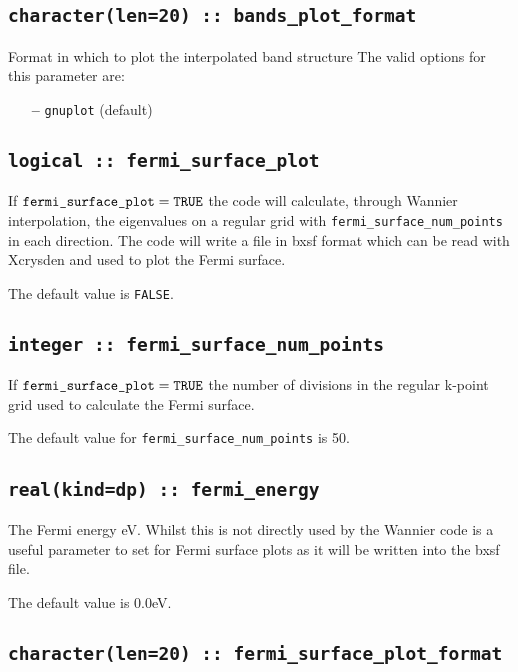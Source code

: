 \subsection[bands\_plot\_format]{\tt character(len=20) :: bands\_plot\_format}

Format in which to plot the interpolated band structure
The valid options for this parameter are:
\begin{itemize}
\item[{\bf --}] \verb#gnuplot# (default)
\end{itemize}

\subsection[fermi\_surface\_plot]{\tt logical :: fermi\_surface\_plot}

If $\verb#fermi_surface_plot#=\verb#TRUE#$ the code will calculate,
through Wannier interpolation, the
eigenvalues on a regular grid with \verb#fermi_surface_num_points# in
each direction. The code will write a file in bxsf format which can be
read with Xcrysden and used to plot the Fermi surface.

The default value is \verb#FALSE#.


\subsection[fermi\_surface\_num\_points]{\tt integer :: fermi\_surface\_num\_points}

If $\verb#fermi_surface_plot#=\verb#TRUE#$ the number of divisions in
the regular k-point grid used to calculate the Fermi surface.

The default value for \verb#fermi_surface_num_points# is 50.


\subsection[fermi\_energy]{\tt real(kind=dp) :: fermi\_energy}
The Fermi energy eV. Whilst this is not directly used by the Wannier 
code is a useful parameter to set for Fermi surface plots as
it will be written into the bxsf file.

The default value is 0.0eV.


\subsection[fermi\_surface\_plot\_format]{\tt character(len=20) :: fermi\_surface\_plot\_format}

